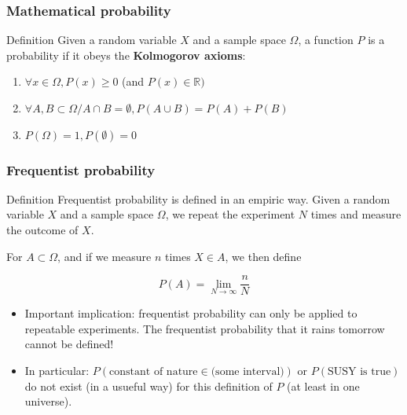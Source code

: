 \documentclass[9pt]{beamer}
\newif\ifmynote
\newcommand\mynote[1]{%
\ifmynote \textbf{#1} \else \fi
}
\begin{document}
\begin{frame}
 \frametitle{Mathematical probability}
 
 \mynote{Écrire au tableau avant}
 
 \begin{block}{Definition}
  Given a random variable $X$ and a sample space $\Omega$, a function $P$ is a probability if it obeys the \textbf{Kolmogorov axioms}:
  
  \begin{enumerate}
   \item<2-> $\forall x \in \Omega, P(x) \geq 0$ (and $P(x) \in \mathbb{R})$
   \item<3-> $\forall A, B \subset \Omega / A \cap B = \emptyset, P(A \cup B) = P(A) + P(B) $
   \item<4-> $P(\Omega) = 1, P(\emptyset)=0$ 
  \end{enumerate}

 \end{block}
 

\end{frame}

\begin{frame}
 \frametitle{Frequentist probability}
 
 \mynote{Écrire au tableau (au moins l'équation)}
 
 \begin{block}{Definition}
 Frequentist probability is defined in an empiric way. Given a random variable $X$ and a sample space $\Omega$, we repeat the experiment $N$ times and measure the outcome of $X$.
 
 For $A \subset \Omega$, and if we measure $n$ times $X \in A$, we then define 
 
 $$P(A) = \lim_{N \to \infty} \frac{n}{N}$$
\end{block}

\begin{itemize}
 \item<2-> Important implication: frequentist probability can only be applied to repeatable experiments. The frequentist probability that it rains tomorrow cannot be defined!
 \item<3-> In particular: $P(\text{constant of nature} \in \text{(some interval)})$ or $P(\text{SUSY is true})$ \alert{do not exist} (in a usueful way) for this definition of $P$ (at least in one universe).
\end{itemize}

\end{frame}
\end{document}
